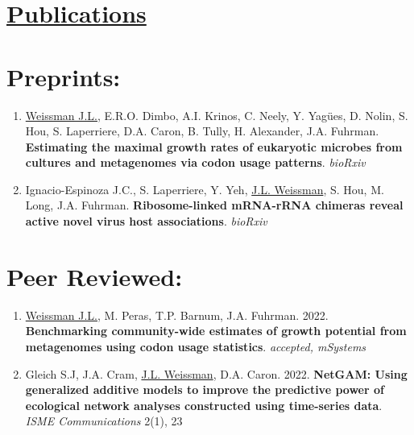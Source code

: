 \documentclass[]{res}
\begin{document}
\begin{resume}
\begin{itemize}[leftmargin=*]
\end{itemize} 

 
 \section{\underline{Publications}} \vspace{2mm}
 
 
 \section{Preprints:} \vspace{0mm}
  
 \begin{enumerate}[leftmargin=*]
 \setlength\itemsep{0.25em}
 
\item \underline{Weissman J.L.}, E.R.O. Dimbo, A.I. Krinos, C. Neely, Y. Yag\"{ues}, D. Nolin, S. Hou, S. Laperriere, D.A. Caron, B. Tully, H. Alexander, J.A. Fuhrman. {\bf Estimating the maximal growth rates of eukaryotic microbes from cultures and metagenomes via codon usage patterns}. \emph{bioRxiv}

\item Ignacio-Espinoza J.C., S. Laperriere, Y. Yeh, \underline{J.L. Weissman}, S. Hou, M. Long, J.A. Fuhrman. {\bf Ribosome-linked mRNA-rRNA chimeras reveal active novel virus host associations}. \emph{bioRxiv}

  \end{enumerate} 
  

  
 \section{Peer Reviewed:} \vspace{0mm}
 
\begin{enumerate}[leftmargin=*]
 \setlength\itemsep{0.25em}
 
  \item \underline{Weissman J.L.}, M. Peras, T.P. Barnum, J.A. Fuhrman. 2022. {\bf Benchmarking community-wide estimates of growth potential from metagenomes using codon usage statistics}. \emph{accepted, mSystems}
 
 \item Gleich S.J, J.A. Cram, \underline{J.L. Weissman}, D.A. Caron. 2022. {\bf NetGAM: Using generalized additive models to improve the predictive power of ecological network analyses constructed using time-series data}. \emph{ISME Communications} 2(1), 23
 

\end{enumerate}
\end{resume}
\end{document}
